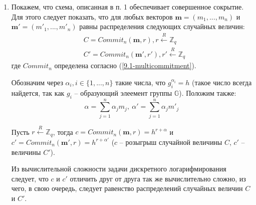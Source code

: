 \documentclass[12pt, a4paper]{extarticle}
\begin{document}
\begin{enumerate}
    \item Покажем, что схема, описанная в п. 1 обеспечивает совершенное сокрытие. Для этого следует 
    	показать, что для любых векторов $\mathbf{m} = (m_1, ..., m_n)$ и $\mathbf{m'} = (m'_1, ..., 
    	m'_n)$ равны распределения следующих случайных величин:
        \begin{equation*}
            \begin{split}
                & C  = Commit_n(\mathbf{m},  r),  r  \xleftarrow{R} \mathbb{Z}_q \\
                & C' = Commit_n(\mathbf{m'}, r'), r' \xleftarrow{R} \mathbb{Z}_q
            \end{split}
        \end{equation*}
        где $Commit_n$ определена согласно (\ref{9.1-multicommitment}).
        
        Обозначим через $\alpha_i, i \in \{1, ..., n\}$ такие числа, что $g_i^{\alpha_i} = h$ 
        (такое число всегда найдется, так как $g_i$ -- образующий элеемент группы $\mathbb{G}$). 
        Положим также:
        \begin{equation*}
            \alpha = \sum_{j = 1}^{n} \alpha_j m_j,\ \alpha' = \sum_{j = 1}^{n} \alpha_j m'_j
        \end{equation*}
        
        Пусть $r \xleftarrow{R} \mathbb{Z}_q$, тогда $c = Commit_n(\mathbf{m}, r) = h^{r + \alpha}$ 
        и $c' = Commit_n(\mathbf{m'}, r) = h^{r + \alpha'}$ ($c$ -- розыгрыш случайной величины $C$, 
        $c'$ -- величины $C'$).
        
        Из вычислительной сложности задачи дискретного логарифмирования следует, что $c$ и $c'$ 
        отличить друг от друга так же вычислительно сложно, из чего, в свою очередь, следует 
        равенство распределений случайных величин $C$ и $C'$.
        

\end{enumerate}
\end{document}
